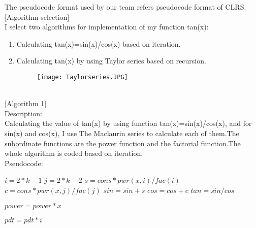 \documentclass[12pt]{article}
\newcommand{\TITLE}[1]{\item[#1]}
\begin{document}
The pseudocode format used by our team refers pseudocode format of CLRS.\\


[Algorithm selection]\\


I select two algorithms for implementation of my function tan(x):\\
\begin{enumerate}
\item  Calculating tan(x)=sin(x)/cos(x) based on iteration.\\

\item  Calculating tan(x) by using Taylor series based on recursion.
\begin{figure}[ht]
\centering
\texttt{[image: Taylorseries.JPG]}
\label{fig:label}
\end{figure}
\end{enumerate}\\


[Algorithm 1]\\


Description:\\


Calculating the value of tan(x) by using function tan(x)=sin(x)/cos(x), and for sin(x) and cos(x), I use The Maclaurin series to calculate each of them.The subordinate functions are the power function and the factorial function.The whole algorithm is coded based on iteration. \\

Pseudocode:\\


\begin{algorithmic}[1]
  \TITLE{\textsc{tan}$(x)$}
  \STATE $i=2*k-1$
  \STATE $j=2*k-2$
  \STATE $s=cons*pwr(x,i)/fac(i)$
  \STATE $c=cons*pwr(x,j)/fac(j)$
  \STATE $sin=sin+s$
  \STATE $cos=cos+c$
  \ENDFOR
  \STATE $tan=sin/cos$
\end{algorithmic}

\begin{algorithmic}[1] 
  \TITLE{\textsc{pwr}$(x,n)$}
  \ENDIF
  \STATE $power=power*x$
  \ENDFOR
\end{algorithmic}

\begin{algorithmic}[1] 
  \TITLE{\textsc{fac}$(n)$}
  \ENDIF
  \STATE $pdt=pdt*i$
  \ENDFOR
\end{algorithmic}
\end{document}
